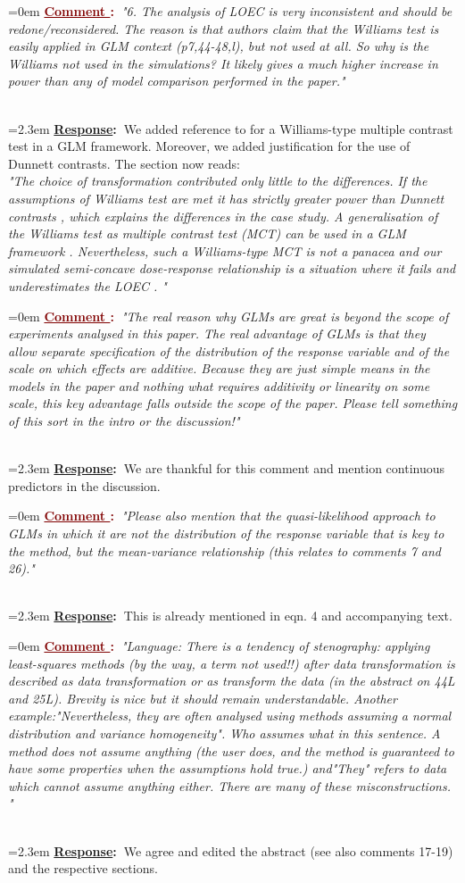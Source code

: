 \documentclass[12pt]{article}
\newcounter{cN}
\newcommand{\comment}[1]{
	\vspace{2em} 
	\refstepcounter{cN} %
	\noindent \hangindent=0em \textbf{\textcolor{Maroon}{\uline{Comment \thecN}:~}}\emph{"#1"}
	}
\newcommand{\response}[1]{
	\\[0.25em] 
	\hangindent=2.3em \textbf{\textcolor{NavyBlue}{\uline{Response}:~}}#1 
	}
\begin{document}
\comment{6.	The analysis of LOEC is very inconsistent and should be redone/reconsidered. The reason is that authors claim that the Williams test is easily applied in GLM context (p7,44-48,l), but not used at all. So why is the Williams not used in the simulations? It likely gives a much higher increase in power than any of model comparison performed in the paper.}
\response{We added reference to \citet{hothorn_simultaneous_2008} for a Williams-type multiple contrast test in a GLM framework.
Moreover, we added justification for the use of Dunnett contrasts. The section now reads: \\
\emph{"The choice of transformation contributed only little to the differences. 
If the assumptions of Williams test  are met it has strictly greater power than Dunnett contrasts \citep{jaki_statistical_2013}, which explains the differences in the case study.
A generalisation of the Williams test as multiple contrast test (MCT) can be used in a GLM framework \citep{hothorn_simultaneous_2008}.
Nevertheless, such a Williams-type MCT is not a panacea \citep{hothorn_statistical_2014} and our simulated semi-concave dose-response relationship is a situation where it fails and underestimates the LOEC \citep{kuiper_identification_2014}. "}
}

\comment{The real reason why GLMs are great is beyond the scope of experiments analysed in this paper. The real advantage of GLMs is that they allow separate specification of the distribution of the response variable and of the scale on which effects are additive. Because they are just simple means in the models in the paper and nothing what requires additivity or linearity on some scale, this key advantage falls outside the scope of the paper. Please tell something of this sort in the intro or the discussion!}
\response{We are thankful for this comment and mention continuous predictors in the discussion.}

\comment{Please also mention that the quasi-likelihood approach to GLMs in which it are not the distribution of the response variable that is key to the method, but the mean-variance relationship (this relates to comments 7 and  26).}
\response{This is already mentioned in eqn. 4 and accompanying text.}

\comment{Language:  There is a tendency of stenography: applying least-squares methods (by the way, a term not used!!) after data transformation is described as data transformation or as transform the data (in the abstract on 44L and 25L). Brevity is nice but it should remain understandable. Another example:"Nevertheless, they are often analysed using methods assuming a normal distribution and variance homogeneity". Who assumes what in this sentence. A method does not assume anything (the user does, and the method is guaranteed to have some properties when the assumptions hold true.) and"They" refers to data which cannot assume anything either. There are many of these misconstructions. }
\response{We agree and edited the abstract (see also comments 17-19) and the respective sections.}
\end{document}
